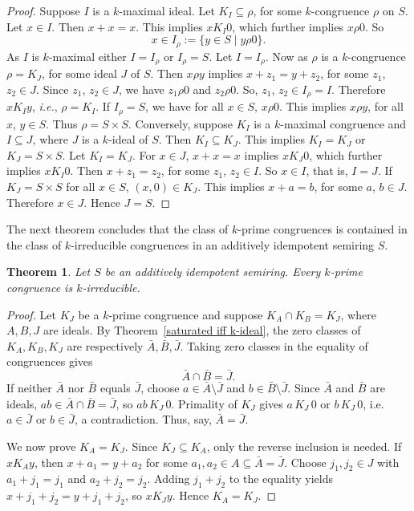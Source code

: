 \documentclass[11pt,leqno]{amsart}
\newtheorem{theorem}{Theorem}[section]
\theoremstyle{definition}
\numberwithin{equation}{section}
\begin{document}
 \begin{proof}
     Suppose $I$ is a $k$-maximal ideal. Let $K_I\subseteq \rho$, for some $k$-congruence $\rho$ on $S$. Let $x\in I$. Then $x+x=x$. This implies $xK_I0$, which further implies $x\rho0$. So $$x\in I_\rho :=\{y\in S\mid y\rho0\}.$$ As $I$ is $k$-maximal either $I=I_\rho$ or $I_\rho=S$. Let $I=I_\rho$. Now as $\rho$ is a $k$-congruence $\rho=K_J$, for some ideal $J$ of $S$. Then $x\rho y$ implies $x+z_1=y+z_2$, for some $z_1$, $z_2\in J$. Since $z_1$, $z_2\in J$, we have $z_1\rho0$ and $z_2\rho0$. So, $z_1$, $z_2\in I_\rho=I$. Therefore $xK_Iy$, \textit{i.e.}, $\rho=K_I$. If $I_\rho=S$, we have for all $x\in S$, $x\rho0$. This implies $x\rho y$, for all $x$, $y\in S$. Thus $\rho=S\times S$.
Conversely, suppose $K_I$ is a $k$-maximal congruence and $I\subseteq J$, where $J$ is a $k$-ideal of $S$. Then $K_I\subseteq K_J$. This implies $K_I=K_J$ or $K_J=S\times S$. Let $K_I=K_J$. For $x\in J$, $x+x=x$ implies $xK_J0$, which further implies $xK_I0$. Then $x+z_1=z_2$, for some $z_1$, $z_2\in I$. So $x\in I$, that is, $I=J$. If $K_J=S\times S$ for all $x\in S$, $(x,0)\in K_J$. This implies $x+a=b$, for some $a$, $b\in J$. Therefore $x\in J$. Hence $J=S$.
 \end{proof}
 The next theorem concludes that the class of $k$-prime congruences is contained in the class of $k$-irreducible congruences in an additively idempotent semiring $S$. 
 
 \begin{theorem}
    Let $S$ be an additively idempotent semiring. Every $k$-prime congruence is $k$-irreducible.
\end{theorem}

\begin{proof}
Let $K_J$ be a $k$-prime congruence and suppose $K_A\cap K_B=K_J$, where $A,B,J$ are ideals. By Theorem~\ref{saturated iff k-ideal}, the zero classes of $K_A,K_B,K_J$ are respectively $\bar A,\bar B,\bar J$. Taking zero classes in the equality of congruences gives
\[
\bar A\cap\bar B=\bar J.
\]
If neither $\bar A$ nor $\bar B$ equals $\bar J$, choose $a\in\bar A\setminus\bar J$ and $b\in\bar B\setminus\bar J$. Since $\bar A$ and $\bar B$ are ideals, $ab\in\bar A\cap\bar B=\bar J$, so $ab\,K_J\,0$. Primality of $K_J$ gives $a\,K_J\,0$ or $b\,K_J\,0$, i.e. $a\in\bar J$ or $b\in\bar J$, a contradiction. Thus, say, $\bar A=\bar J$.

We now prove $K_A=K_J$. Since $K_J\subseteq K_A$, only the reverse inclusion is needed. If $xK_Ay$, then $x+a_1=y+a_2$ for some $a_1,a_2\in A\subseteq\bar A=\bar J$. Choose $j_1,j_2\in J$ with $a_1+j_1=j_1$ and $a_2+j_2=j_2$. Adding $j_1+j_2$ to the equality yields $x+j_1+j_2=y+j_1+j_2$, so $xK_Jy$. Hence $K_A=K_J$.
\end{proof}
\end{document}

